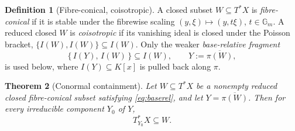 \documentclass[11pt]{article}
\theoremstyle{plain}
\newtheorem{theorem}{Theorem}[section]
\theoremstyle{definition}
\newtheorem{definition}[theorem]{Definition}
\theoremstyle{remark}
\theoremstyle{plain}
\begin{document}
\begin{definition}[Fibre-conical, coisotropic]\label{def:cois}
A closed subset $W\subseteq T^*X$ is \emph{fibre-conical} if it is stable under
the fibrewise scaling $(y,\xi)\mapsto(y,t\xi)$, $t\in\mathbb{G}_m$. A reduced
closed $W$ is \emph{coisotropic} if its vanishing ideal is closed under the
Poisson bracket, $\{I(W),I(W)\}\subseteq I(W)$. Only the weaker
\emph{base-relative fragment}
\begin{equation}\label{eq:baserel}
  \{\,I(Y),\,I(W)\,\}\subseteq I(W),\qquad Y:=\overline{\pi(W)},
\end{equation}
is used below, where $I(Y)\subseteq K[x]$ is pulled back along $\pi$.
\end{definition}

\begin{theorem}[Conormal containment]\label{thm:coisconormal}
Let $W\subseteq T^*X$ be a nonempty reduced closed fibre-conical subset
satisfying \eqref{eq:baserel}, and let $Y=\overline{\pi(W)}$. Then for every
irreducible component $Y_0$ of $Y$,
\begin{equation}\label{eq:conormalin}
  T^*_{Y_0}X\subseteq W .
\end{equation}
\end{theorem}
\end{document}
